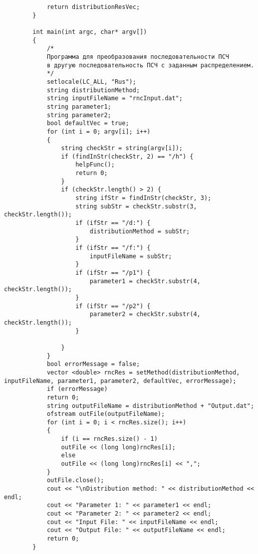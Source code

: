 \documentclass[bachelor, och, coursework]{shiza}
\begin{document}
\begin{verbatim}
			return distributionResVec;
		}
		
		int main(int argc, char* argv[])
		{
			/*
			Программа для преобразования последовательности ПСЧ
			в другую последовательность ПСЧ с заданным распределением.
			*/
			setlocale(LC_ALL, "Rus");
			string distributionMethod;
			string inputFileName = "rncInput.dat";
			string parameter1;
			string parameter2;
			bool defaultVec = true;
			for (int i = 0; argv[i]; i++)
			{
				string checkStr = string(argv[i]);
				if (findInStr(checkStr, 2) == "/h") {
					helpFunc();
					return 0;
				}
				if (checkStr.length() > 2) {
					string ifStr = findInStr(checkStr, 3);
					string subStr = checkStr.substr(3, checkStr.length());
					if (ifStr == "/d:") {
						distributionMethod = subStr;
					}
					if (ifStr == "/f:") {
						inputFileName = subStr;
					}
					if (ifStr == "/p1") {
						parameter1 = checkStr.substr(4, checkStr.length());
					}
					if (ifStr == "/p2") {
						parameter2 = checkStr.substr(4, checkStr.length());
					}
					
				}
			}
			bool errorMessage = false;
			vector <double> rncRes = setMethod(distributionMethod, inputFileName, parameter1, parameter2, defaultVec, errorMessage);
			if (errorMessage)
			return 0;
			string outputFileName = distributionMethod + "Output.dat";
			ofstream outFile(outputFileName);
			for (int i = 0; i < rncRes.size(); i++)
			{
				if (i == rncRes.size() - 1)
				outFile << (long long)rncRes[i];
				else
				outFile << (long long)rncRes[i] << ",";
			}
			outFile.close();
			cout << "\nDistribution method: " << distributionMethod << endl;
			cout << "Parameter 1: " << parameter1 << endl;
			cout << "Parameter 2: " << parameter2 << endl;
			cout << "Input File: " << inputFileName << endl;
			cout << "Output File: " << outputFileName << endl;
			return 0;
		}
	\end{verbatim}

	
\end{document}
